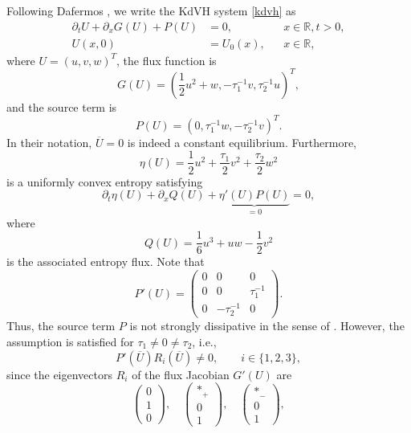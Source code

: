\documentclass{article}
\theoremstyle{plain}
\theoremstyle{definition}
\numberwithin{theorem}{section}
\begin{document}
Following Dafermos \cite[Section~5.2]{dafermos2010hyperbolic}, we write the KdVH system \eqref{kdvh} as
\begin{equation}\label{eq:kdvh_con}
\begin{aligned}
    \partial_t U + \partial_x G(U) + P(U) &= 0, && x \in \mathbb{R}, t > 0, \\
    U(x, 0) &= U_0(x), && x \in \mathbb{R},
\end{aligned}
\end{equation}
where $U = (u, v, w)^T$, the flux function is
\begin{equation}
    G(U) = \left( \frac{1}{2} u^2 + w, -\tau_1^{-1} v, \tau_2^{-1} u \right)^T,
\end{equation}
and the source term is
\begin{equation}
    P(U) = \left( 0, \tau_1^{-1} w, -\tau_2^{-1} v \right)^T.
\end{equation}
In their notation, $\overline{U} = 0$ is indeed a constant equilibrium.
Furthermore,
\begin{equation}
    \eta(U) = \frac{1}{2} u^2 + \frac{\tau_1}{2} v^2 + \frac{\tau_2}{2} w^2
\end{equation}
is a uniformly convex entropy satisfying
\begin{equation}\label{eq:kdvh_entropyeq}
    \partial_t \eta(U) + \partial_x Q(U) + \underbrace{\eta'(U) P(U)}_{= 0} = 0,
\end{equation}
where
\begin{equation}
    Q(U) = \frac{1}{6} u^3 + u w - \frac{1}{2} v^2
\end{equation}
is the associated entropy flux. Note that
\begin{equation}
    P'(U) = \begin{pmatrix}
        0 & 0 & 0 \\
        0 & 0 & \tau_1^{-1} \\
        0 & -\tau_2^{-1} & 0
    \end{pmatrix}.
\end{equation}
Thus, the source term $P$ is not strongly dissipative in the sense of \cite[Section~5.2, p.~109]{dafermos2010hyperbolic}.
However, the assumption \cite[(5.2.12)]{dafermos2010hyperbolic} is satisfied for $\tau_1 \ne 0 \ne \tau_2$, i.e.,
\begin{equation}
    P'(\overline{U}) R_i(\overline{U}) \ne 0, \qquad i \in \{1, 2, 3\},
\end{equation}
since the eigenvectors $R_i$ of the flux Jacobian $G'(U)$ are \cite{besse2022perfectly}
\begin{equation}
    \begin{pmatrix}
        0 \\ 1 \\ 0
    \end{pmatrix},
    \quad
    \begin{pmatrix}
        *_+ \\ 0 \\ 1
    \end{pmatrix},
    \quad
    \begin{pmatrix}
        *_- \\ 0 \\ 1
    \end{pmatrix},
\end{equation}
\end{document}
